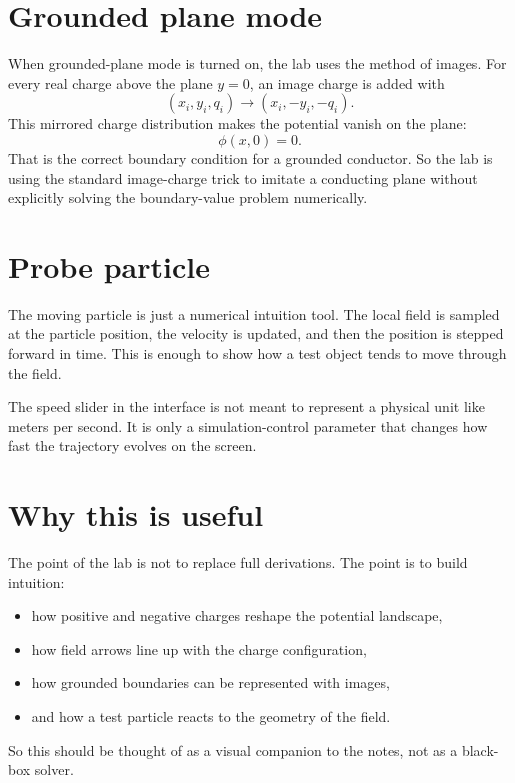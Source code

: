 \documentclass[11pt]{article}
\begin{document}
\section*{Grounded plane mode}
When grounded-plane mode is turned on, the lab uses the method of images. For every real charge above the plane $y=0$, an image charge is added with
\[
(x_i,y_i,q_i)\longrightarrow (x_i,-y_i,-q_i).
\]
This mirrored charge distribution makes the potential vanish on the plane:
\[
\phi(x,0)=0.
\]
That is the correct boundary condition for a grounded conductor. So the lab is using the standard image-charge trick to imitate a conducting plane without explicitly solving the boundary-value problem numerically.

\section*{Probe particle}
The moving particle is just a numerical intuition tool. The local field is sampled at the particle position, the velocity is updated, and then the position is stepped forward in time. This is enough to show how a test object tends to move through the field.

The speed slider in the interface is not meant to represent a physical unit like meters per second. It is only a simulation-control parameter that changes how fast the trajectory evolves on the screen.

\section*{Why this is useful}
The point of the lab is not to replace full derivations. The point is to build intuition:
\begin{itemize}
\item how positive and negative charges reshape the potential landscape,
\item how field arrows line up with the charge configuration,
\item how grounded boundaries can be represented with images,
\item and how a test particle reacts to the geometry of the field.
\end{itemize}

So this should be thought of as a visual companion to the notes, not as a black-box solver.
\end{document}
